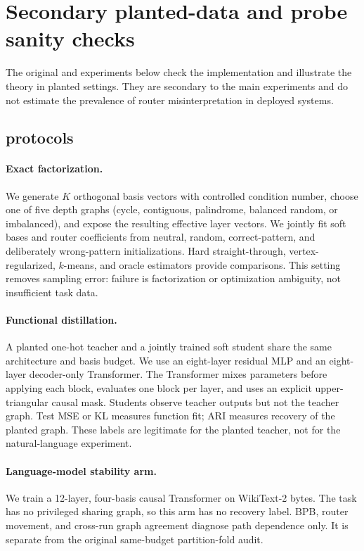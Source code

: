 

\section{Secondary planted-data and probe sanity checks}
\label{app:secondary-sanity}

The original \TyingBench{} and \method{} experiments below check the
implementation and illustrate the theory in planted settings. They are
secondary to the main experiments and do not estimate the prevalence of
router misinterpretation in deployed systems.

\subsection{\TyingBench{} protocols}

\paragraph{Exact factorization.}
We generate $K$ orthogonal basis vectors with controlled condition number,
choose one of five depth graphs (cycle, contiguous, palindrome, balanced
random, or imbalanced), and expose the resulting effective layer vectors.  We
jointly fit soft bases and router coefficients from neutral, random,
correct-pattern, and deliberately wrong-pattern initializations.  Hard
straight-through, vertex-regularized, $k$-means, and oracle estimators provide
comparisons.  This setting removes sampling error: failure is factorization or
optimization ambiguity, not insufficient task data.

\paragraph{Functional distillation.}
A planted one-hot teacher and a jointly trained soft student share the same
architecture and basis budget.  We use an eight-layer residual MLP and an
eight-layer decoder-only Transformer.  The Transformer mixes parameters before
applying each block, evaluates one block per layer, and uses an explicit
upper-triangular causal mask.  Students observe teacher outputs but not the
teacher graph.  Test MSE or KL measures function fit; ARI measures recovery of
the planted graph.  These labels are legitimate for the planted teacher, not
for the natural-language experiment.

\paragraph{Language-model stability arm.}
We train a 12-layer, four-basis causal Transformer on WikiText-2 bytes.  The
task has no privileged sharing graph, so this arm has no recovery label.  BPB,
router movement, and cross-run graph agreement diagnose path dependence only.
It is separate from the original same-budget partition-fold audit.

